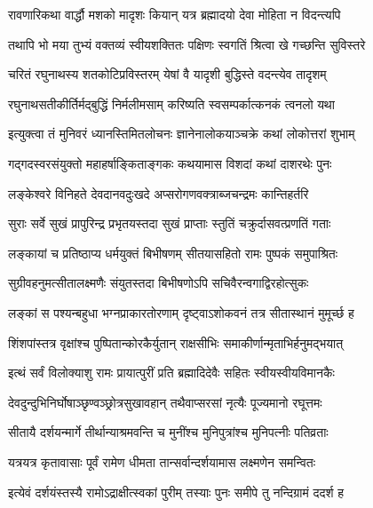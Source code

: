 \twolineshloka
{रावणारिकथा वार्द्धौ मशको मादृशः कियान्}
{यत्र ब्रह्मादयो देवा मोहिता न विदन्त्यपि}%

\twolineshloka
{तथापि भो मया तुभ्यं वक्तव्यं स्वीयशक्तितः}
{पक्षिणः स्वगतिं श्रित्वा खे गच्छन्ति सुविस्तरे}%

\twolineshloka
{चरितं रघुनाथस्य शतकोटिप्रविस्तरम्}
{येषां वै यादृशी बुद्धिस्ते वदन्त्येव तादृशम्}%

\twolineshloka
{रघुनाथसतीकीर्तिर्मद्बुद्धिं निर्मलीमसाम्}
{करिष्यति स्वसम्पर्कात्कनकं त्वनलो यथा}%


\twolineshloka
{इत्युक्त्वा तं मुनिवरं ध्यानस्तिमितलोचनः}
{ज्ञानेनालोकयाञ्चक्रे कथां लोकोत्तरां शुभाम्}%

\twolineshloka
{गद्गदस्वरसंयुक्तो महाहर्षाङ्किताङ्गकः}
{कथयामास विशदां कथां दाशरथेः पुनः}%


\twolineshloka
{लङ्केश्वरे विनिहते देवदानवदुःखदे}
{अप्सरोगणवक्त्राब्जचन्द्रमः कान्तिहर्तरि}%

\twolineshloka
{सुराः सर्वे सुखं प्रापुरिन्द्र प्रभृतयस्तदा}
{सुखं प्राप्ताः स्तुतिं चक्रुर्दासवत्प्रणतिं गताः}%

\twolineshloka
{लङ्कायां च प्रतिष्ठाप्य धर्मयुक्तं बिभीषणम्}
{सीतयासहितो रामः पुष्पकं समुपाश्रितः}%

\twolineshloka
{सुग्रीवहनुमत्सीतालक्ष्मणैः संयुतस्तदा}
{बिभीषणोऽपि सचिवैरन्वगाद्विरहोत्सुकः}%

\twolineshloka
{लङ्कां स पश्यन्बहुधा भग्नप्राकारतोरणाम्}
{दृष्ट्वाऽशोकवनं तत्र सीतास्थानं मुमूर्च्छ ह}%

\twolineshloka
{शिंशपांस्तत्र वृक्षांश्च पुष्पितान्कोरकैर्युतान्}
{राक्षसीभिः समाकीर्णान्मृताभिर्हनुमद्भयात्}%

\twolineshloka
{इत्थं सर्वं विलोक्याशु रामः प्रायात्पुरीं प्रति}
{ब्रह्मादिदेवैः सहितः स्वीयस्वीयविमानकैः}%

\twolineshloka
{देवदुन्दुभिनिर्घोषाञ्छृण्वञ्छ्रोत्रसुखावहान्}
{तथैवाप्सरसां नृत्यैः पूज्यमानो रघूत्तमः}%

\twolineshloka
{सीतायै दर्शयन्मार्गे तीर्थान्याश्रमवन्ति च}
{मुनींश्च मुनिपुत्रांश्च मुनिपत्नीः पतिव्रताः}%

\twolineshloka
{यत्रयत्र कृतावासाः पूर्वं रामेण धीमता}
{तान्सर्वान्दर्शयामास लक्ष्मणेन समन्वितः}%

\twolineshloka
{इत्येवं दर्शयंस्तस्यै रामोऽद्राक्षीत्स्वकां पुरीम्}
{तस्याः पुनः समीपे तु नन्दिग्रामं ददर्श ह}%

